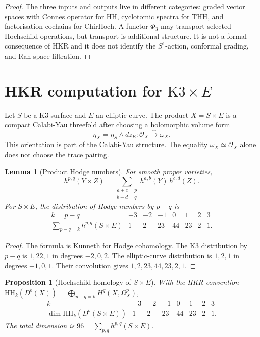 \documentclass[11pt]{amsart}
\newtheorem{proposition}[theorem]{Proposition}
\newtheorem{lemma}[theorem]{Lemma}
\newcommand{\HH}{\mathrm{HH}}
\newcommand{\THH}{\mathrm{THH}}
\newcommand{\ChirHoch}{\mathrm{ChirHoch}}
\newcommand{\cO}{\mathcal{O}}
\newcommand{\Db}{D^{b}}
\begin{document}
\begin{proof}
The three inputs and outputs live in different categories:
graded vector spaces with Connes operator for $\HH$, cyclotomic spectra
for $\THH$, and factorisation cochains for $\ChirHoch$.  A functor
$\Phi_3$ may transport selected Hochschild operations, but transport
is additional structure.  It is not a formal consequence of HKR and it
does not identify the $S^1$-action, conformal grading, and Ran-space
filtration.
\end{proof}

\section{HKR computation for \texorpdfstring{$\mathrm{K3}\times E$}{K3 x E}}

Let $S$ be a K3 surface and $E$ an elliptic curve.  The product
$X=S\times E$ is a compact Calabi-Yau threefold after choosing a
holomorphic volume form
\[
 \eta_X=\eta_S\wedge dz_E:
 \cO_X \xrightarrow{\sim} \omega_X .
\]
This orientation is part of the Calabi-Yau structure.  The equality
$\omega_X\simeq\cO_X$ alone does not choose the trace pairing.

\begin{lemma}[Product Hodge numbers]
\label{lem:k3e-hodge-product}
For smooth proper varieties,
\[
 h^{p,q}(Y\times Z)
 =
 \sum_{\substack{a+c=p\\ b+d=q}}
 h^{a,b}(Y)\,h^{c,d}(Z).
\]
For $S\times E$, the distribution of Hodge numbers by $p-q$ is
\[
\begin{array}{c|rrrrrrr}
k=p-q & -3&-2&-1&0&1&2&3\\ \hline
\sum_{p-q=k} h^{p,q}(S\times E) & 1&2&23&44&23&2&1 .
\end{array}
\]
\end{lemma}

\begin{proof}
The formula is Kunneth for Hodge cohomology.  The K3 distribution by
$p-q$ is $1,22,1$ in degrees $-2,0,2$.  The elliptic-curve
distribution is $1,2,1$ in degrees $-1,0,1$.  Their convolution gives
$1,2,23,44,23,2,1$.
\end{proof}

\begin{proposition}[Hochschild homology of \texorpdfstring{$S\times E$}{S x E}]
\label{prop:k3e-hh-hkr}
With the HKR convention
$\HH_k(\Db(X))=\bigoplus_{p-q=k}H^q(X,\Omega_X^p)$,
\[
\begin{array}{c|rrrrrrr}
k & -3&-2&-1&0&1&2&3\\ \hline
\dim \HH_k(\Db(S\times E)) & 1&2&23&44&23&2&1 .
\end{array}
\]
The total dimension is $96=\sum_{p,q}h^{p,q}(S\times E)$.
\end{proposition}
\end{document}
